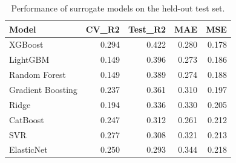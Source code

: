\begin{table}
\caption{Performance of surrogate models on the held-out test set.}
\label{tab:model_comparison}
\begin{tabular}{lrrrr}
\toprule
Model & CV_R2 & Test_R2 & MAE & MSE \\
\midrule
XGBoost & 0.294 & 0.422 & 0.280 & 0.178 \\
LightGBM & 0.149 & 0.396 & 0.273 & 0.186 \\
Random Forest & 0.149 & 0.389 & 0.274 & 0.188 \\
Gradient Boosting & 0.237 & 0.361 & 0.310 & 0.197 \\
Ridge & 0.194 & 0.336 & 0.330 & 0.205 \\
CatBoost & 0.247 & 0.312 & 0.261 & 0.212 \\
SVR & 0.277 & 0.308 & 0.321 & 0.213 \\
ElasticNet & 0.250 & 0.293 & 0.344 & 0.218 \\
\bottomrule
\end{tabular}
\end{table}
